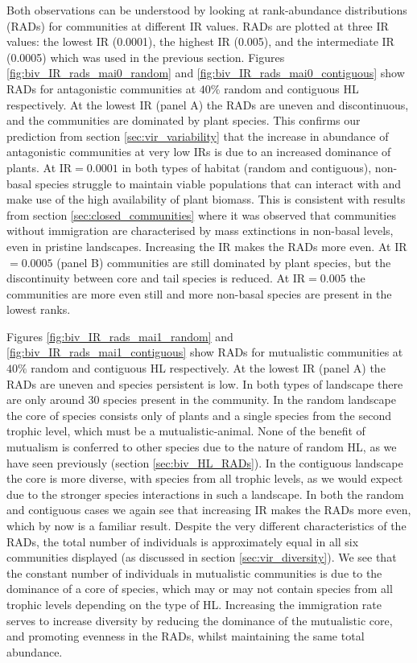 Both observations can be understood by looking at rank-abundance distributions (RADs) for communities at different IR values. RADs are plotted at three IR values: the lowest IR (0.0001), the highest IR (0.005), and the intermediate IR (0.0005) which was used in the previous section. Figures \ref{fig:biv_IR_rads_mai0_random} and \ref{fig:biv_IR_rads_mai0_contiguous} show RADs for antagonistic communities at $40\%$ random and contiguous HL respectively. At the lowest IR (panel A) the RADs are uneven and discontinuous, and the communities are dominated by plant species. This confirms our prediction from section \ref{sec:vir_variability} that the increase in abundance of antagonistic communities at very low IRs is due to an increased dominance of plants. At IR$=0.0001$ in both types of habitat (random and contiguous), non-basal species struggle to maintain viable populations that can interact with and make use of the high availability of plant biomass. This is consistent with results from section \ref{sec:closed_communities} where it was observed that communities without immigration are characterised by mass extinctions in non-basal levels, even in pristine landscapes. Increasing the IR makes the RADs more even. At IR$=0.0005$  (panel B) communities are still dominated by plant species, but the discontinuity between core and tail species is reduced. At IR$=0.005$ the communities are more even still and more non-basal species are present in the lowest ranks.  

Figures \ref{fig:biv_IR_rads_mai1_random} and \ref{fig:biv_IR_rads_mai1_contiguous} show RADs for mutualistic communities at $40\%$ random and contiguous HL respectively. At the lowest IR (panel A) the RADs are uneven and species persistent is low. In both types of landscape there are only around 30 species present in the community. In the random landscape the core of species consists only of plants and a single species from the second trophic level, which must be a mutualistic-animal. None of the benefit of mutualism is conferred to other species due to the nature of random HL, as we have seen previously (section \ref{sec:biv_HL_RADs}). In the contiguous landscape the core is more diverse, with species from all trophic levels, as we would expect due to the stronger species interactions in such a landscape. In both the random and contiguous cases we again see that increasing IR makes the RADs more even, which by now is a familiar result. Despite the very different characteristics of the RADs, the total number of individuals is approximately equal in all six communities displayed (as discussed in section \ref{sec:vir_diversity}). We see that the constant number of individuals in mutualistic communities is due to the dominance of a core of species, which may or may not contain species from all trophic levels depending on the type of HL. Increasing the immigration rate serves to increase diversity by reducing the dominance of the mutualistic core, and promoting evenness in the RADs, whilst maintaining the same total abundance.

